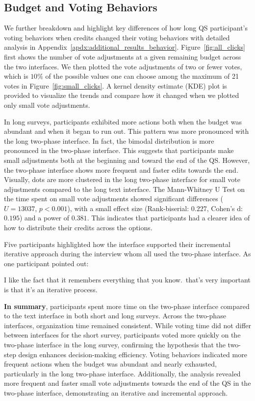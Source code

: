 \subsection{Budget and Voting Behaviors}
We further breakdown and highlight key differences of how long QS participant's voting behaviors when credits changed their voting behaviors with detailed analysis in Appendix~\ref{apdx:additional_results_behavior}. Figure~\ref{fig:all_clicks} first shows the number of vote adjustments at a given remaining budget across the two interfaces. We then plotted the vote adjustments of two or fewer votes, which is $10\%$ of the possible values one can choose among the maximum of 21 votes in Figure~\ref{fig:small_clicks}. A kernel density estimate (KDE) plot is provided to visualize the trends and compare how it changed when we plotted only small vote adjustments.

In long surveys, participants exhibited more actions both when the budget was abundant and when it began to run out. This pattern was more pronounced with the long two-phase interface. In fact, the bimodal distribution is more pronounced in the two-phase interface. This suggests that participants make small adjustments both at the beginning and toward the end of the QS. However, the two-phase interface shows more frequent and faster edits towards the end. Visually, dots are more clustered in the long two-phase interface for small vote adjustments compared to the long text interface. The Mann-Whitney U Test on the time spent on small vote adjustments showed significant differences ($U=13037$, $p<0.001$), with a small effect size (Rank-biserial: $0.227$, Cohen's d: $0.195$) and a power of $0.381$. This indicates that participants had a clearer idea of how to distribute their credits across the options.

Five participants highlighted how the interface supported their incremental iterative approach during the interview whom all used the two-phase interface. As one participant pointed out:

\begin{displayquote}
I like the fact that it remembers everything that you know.~\bracketellipsis that's very important is that it's an iterative process.\hfill{}
\end{displayquote}

\textbf{In summary}, participants spent more time on the two-phase interface compared to the text interface in both short and long surveys. Across the two-phase interfaces, organization time remained consistent. While voting time did not differ between interfaces for the short survey, participants voted more quickly on the two-phase interface in the long survey, confirming the hypothesis that the two-step design enhances decision-making efficiency. Voting behaviors indicated more frequent actions when the budget was abundant and nearly exhausted, particularly in the long two-phase interface. Additionally, the analysis revealed more frequent and faster small vote adjustments towards the end of the QS in the two-phase interface, demonstrating an iterative and incremental approach. 

